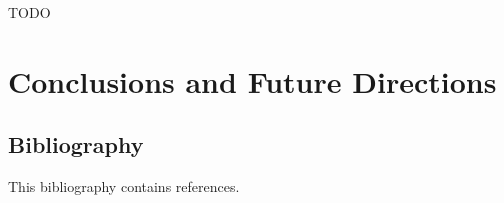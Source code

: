 \documentclass[12pt]{cmuthesis}
\begin{document}
\begin{acknowledgments}
TODO 
\end{acknowledgments}
\restoregeometry

\pagestyle{plain}

\tableofcontents
{}
\listoffigures
{}
\listoftables
\listofalgorithms

\mainmatter







\part{Conclusions and Future Directions}


\chapter*{Bibliography}

\vspace{-25mm}
This bibliography contains  references.
\vspace{10mm}

\printbibliography[heading=none]
\end{document}
